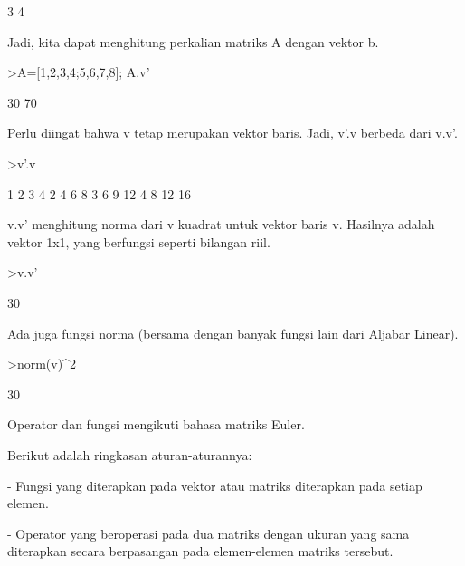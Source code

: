 \documentclass[12pt,arial,letterpaper]{book}
\begin{document}
\begin{eulercomment}
\begin{eulercomment}
\begin{eulercomment}
\begin{eulercomment}
\begin{eulercomment}
\begin{eulercomment}
\begin{euleroutput}
              3 
              4 
\end{euleroutput}
\begin{eulercomment}
Jadi, kita dapat menghitung perkalian matriks A dengan vektor b.
\end{eulercomment}
\begin{eulerprompt}
>A=[1,2,3,4;5,6,7,8]; A.v'
\end{eulerprompt}
\begin{euleroutput}
             30 
             70 
\end{euleroutput}
\begin{eulercomment}
Perlu diingat bahwa v tetap merupakan vektor baris. Jadi, v'.v berbeda
dari v.v'.
\end{eulercomment}
\begin{eulerprompt}
>v'.v
\end{eulerprompt}
\begin{euleroutput}
              1             2             3             4 
              2             4             6             8 
              3             6             9            12 
              4             8            12            16 
\end{euleroutput}
\begin{eulercomment}
v.v' menghitung norma dari v kuadrat untuk vektor baris v. Hasilnya
adalah vektor 1x1, yang berfungsi seperti bilangan riil.
\end{eulercomment}
\begin{eulerprompt}
>v.v'
\end{eulerprompt}
\begin{euleroutput}
  30
\end{euleroutput}
\begin{eulercomment}
Ada juga fungsi norma (bersama dengan banyak fungsi lain dari Aljabar
Linear).
\end{eulercomment}
\begin{eulerprompt}
>norm(v)^2
\end{eulerprompt}
\begin{euleroutput}
  30
\end{euleroutput}
\begin{eulercomment}
Operator dan fungsi mengikuti bahasa matriks Euler.

Berikut adalah ringkasan aturan-aturannya:

- Fungsi yang diterapkan pada vektor atau matriks diterapkan pada
setiap elemen.

- Operator yang beroperasi pada dua matriks dengan ukuran yang sama
diterapkan secara berpasangan pada elemen-elemen matriks tersebut.


\end{eulercomment}
\end{eulercomment}
\end{eulercomment}
\end{eulercomment}
\end{eulercomment}
\end{eulercomment}
\end{eulercomment}
\end{document}
